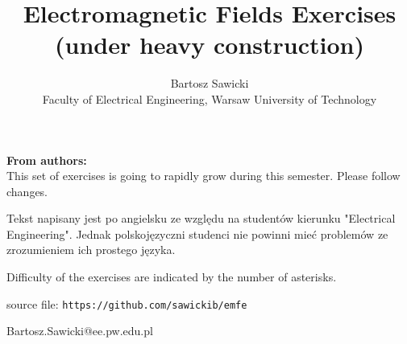 \documentclass[10pt,a4paper]{article}
\title{Electromagnetic Fields Exercises\\ \vspace{0.5cm} \large{(under heavy construction)}}
\author{Bartosz Sawicki \\ \small{Faculty of Electrical Engineering, Warsaw University of Technology}}
\begin{document}
\maketitle

\noindent\textbf{From authors:}\\
This set of exercises is going to rapidly grow during this semester. Please follow changes. 

Tekst napisany jest po angielsku ze względu na studentów kierunku "Electrical Engineering". Jednak polskojęzyczni studenci nie powinni mieć problemów ze zrozumieniem ich prostego języka.

Difficulty of the exercises are indicated by the number of asterisks. 

source file: \verb+https://github.com/sawickib/emfe+

\vspace{0.3cm}
\begin{flushright}
Bartosz.Sawicki@ee.pw.edu.pl
\end{flushright}

\tableofcontents





\end{document}
